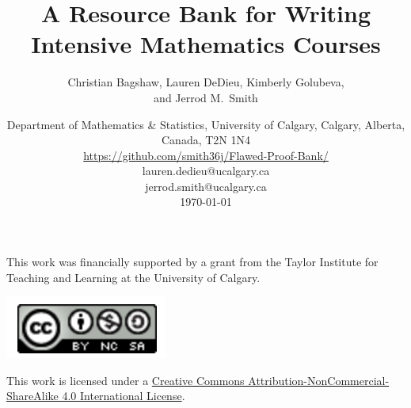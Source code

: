 \documentclass[12pt]{book}
\begin{document}
\title{A Resource Bank for Writing Intensive Mathematics Courses}

\author{Christian Bagshaw, Lauren DeDieu, Kimberly Golubeva,\\ and Jerrod M.~Smith}

\date{%
Department of Mathematics \& Statistics, University of Calgary, Calgary, Alberta, Canada, T2N 1N4\\
\href{https://github.com/smith36j/Flawed-Proof-Bank/}{https://github.com/smith36j/Flawed-Proof-Bank/}\\[2ex]%
lauren.dedieu@ucalgary.ca\\
jerrod.smith@ucalgary.ca\\[2ex]
\today
}

\maketitle

\vspace{50cm}

\begin{center}

This work was financially supported by a grant from the Taylor Institute for Teaching and Learning at the University of Calgary.

\bigskip
\bigskip
\bigskip
\bigskip



\includegraphics{CC.PNG}

\smallskip

This work is licensed under a \href{http://creativecommons.org/licenses/by-nc-sa/4.0/}{Creative Commons Attribution-NonCommercial-ShareAlike 4.0 International License}.

\end{center}




\clearpage
\setcounter{tocdepth}{1}
\tableofcontents

\end{document}
